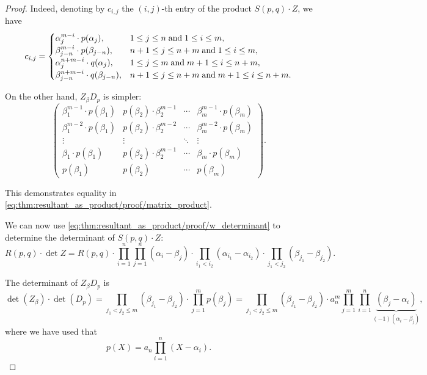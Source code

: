 \begin{proof}
  Indeed, denoting by \( c_{i,j} \) the \( (i, j) \)-th entry of the product \( S(p, q) \cdot Z \), we have
  \begin{equation*}
    c_{i,j} = \begin{cases}
      \alpha_j^{m-i} \cdot p(\alpha_j),         &1 \leq j \leq n \T{and} 1 \leq i \leq m, \\
      \beta_{j-n}^{m-i} \cdot p(\beta_{j-n}),   &n + 1 \leq j \leq n + m \T{and} 1 \leq i \leq m, \\
      \alpha_j^{n+m-i} \cdot q(\alpha_j),       &1 \leq j \leq m \T{and} m + 1 \leq i \leq n + m, \\
      \beta_{j-n}^{n+m-i} \cdot q(\beta_{j-n}), &n + 1 \leq j \leq n + m \T{and} m + 1 \leq i \leq n + m.
    \end{cases}
  \end{equation*}

  On the other hand, \( Z_\beta D_p \) is simpler:
  \begin{equation*}
    \begin{pmatrix}
      \beta_1^{m-1} \cdot p(\beta_1) & p(\beta_2) \cdot \beta_2^{m-1} & \cdots & \beta_m^{m-1} \cdot p(\beta_m) \\
      \beta_1^{m-2} \cdot p(\beta_1) & p(\beta_2) \cdot \beta_2^{m-2} & \cdots & \beta_m^{m-2} \cdot p(\beta_m) \\
      \vdots                         & \vdots                         & \ddots & \vdots                         \\
      \beta_1 \cdot p(\beta_1)       & p(\beta_2) \cdot \beta_2^{m-1} & \cdots & \beta_m \cdot p(\beta_m)       \\
      p(\beta_1)                     & p(\beta_2)                     & \cdots & p(\beta_m)
    \end{pmatrix}.
  \end{equation*}

  This demonstrates equality in \eqref{eq:thm:resultant_as_product/proof/matrix_product}.

  We can now use \eqref{eq:thm:resultant_as_product/proof/w_determinant} to determine the determinant of \( S(p, q) \cdot Z \):
  \begin{equation*}
    R(p, q) \cdot \det Z
    =
    R(p, q) \cdot \prod_{i=1}^n \prod_{j=1}^n (\alpha_i - \beta_j) \cdot \prod_{i_1 < i_2} (\alpha_{i_1} - \alpha_{i_2}) \cdot \prod_{j_1 < j_2} (\beta_{j_1} - \beta_{j_2}).
  \end{equation*}

  The determinant of \( Z_\beta D_p \) is
  \begin{equation*}
    \det(Z_\beta) \cdot \det(D_p)
    =
    \prod_{j_1 < j_2 \leq m} (\beta_{j_1} - \beta_{j_2}) \cdot \prod_{j=1}^m p(\beta_j)
    =
    \prod_{j_1 < j_2 \leq m} (\beta_{j_1} - \beta_{j_2}) \cdot a_n^m \prod_{j=1}^m \prod_{i=1}^n \underbrace{(\beta_j - \alpha_i)}_{(-1)(\alpha_i - \beta_j)},
  \end{equation*}
  where we have used that
  \begin{equation*}
    p(X) = a_n \prod_{i=1}^n (X - \alpha_i).
  \end{equation*}


\end{proof}
